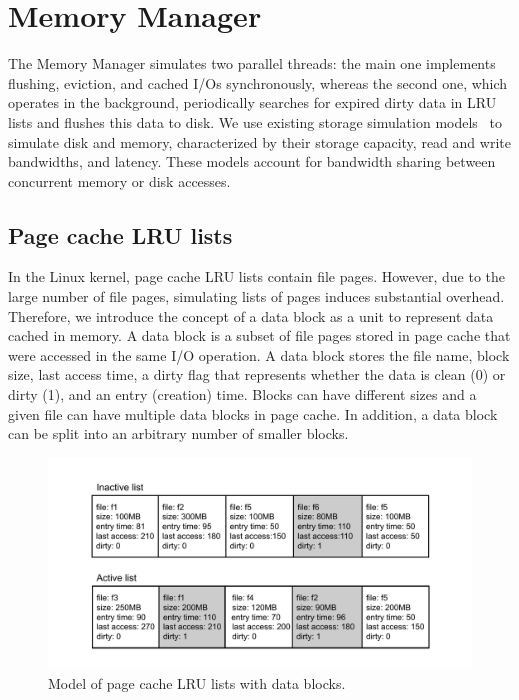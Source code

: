 \section{Memory Manager}

The Memory Manager simulates two parallel threads: the main one
implements flushing, eviction, and cached I/Os synchronously, whereas
the second one, which operates in the background, periodically searches for
expired dirty data in LRU lists and flushes this data to disk. We
use existing storage simulation models~\cite{lebre2015} to simulate disk and
memory, characterized by their storage capacity, read and write
bandwidths, and latency. These models account for
bandwidth sharing between concurrent memory or disk accesses.

\subsection{Page cache LRU lists}

In the Linux kernel, page cache LRU lists contain file pages. However,
due to the large number of file pages, simulating lists of pages
induces substantial overhead.
Therefore, we introduce the concept of a data block as a unit to represent data
cached in memory. A data block is a subset of file pages stored in
page cache that were accessed in the same I/O operation.
A data block stores the file name, block size, last access
time, a dirty flag that represents whether the data is clean (0)
or dirty (1), and an entry (creation) time.
Blocks can have different sizes and a given file can have multiple
data blocks in page cache. In addition, a data block can be split into an
arbitrary number of smaller blocks.

\begin{figure}
       \centering
       \includegraphics[width=0.8\columnwidth]{figures/lru_lists.pdf}
       \caption{Model of page cache LRU lists with data blocks.}
       \label{fig:lrulist}
\end{figure}

